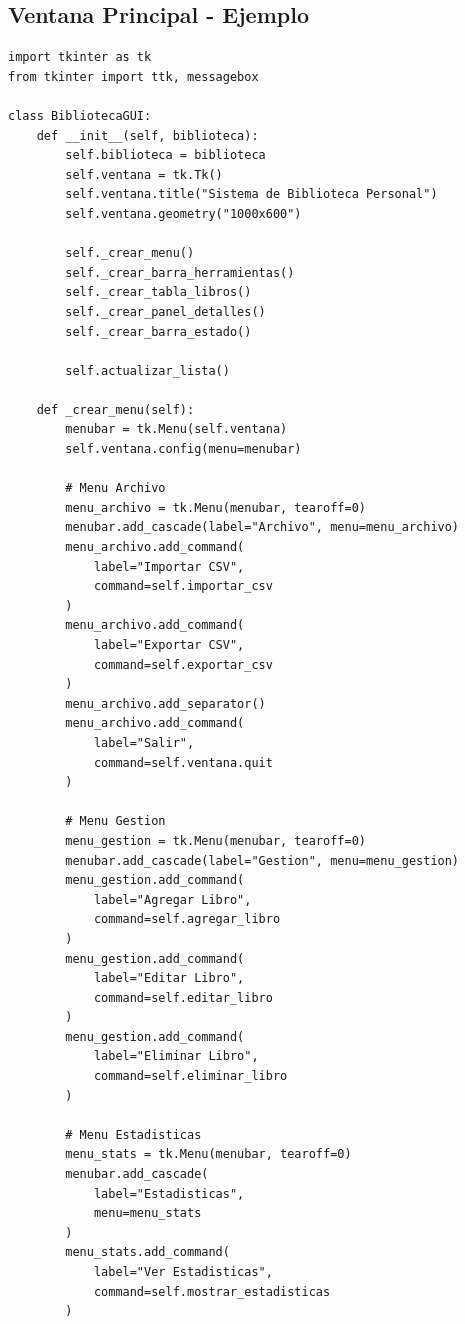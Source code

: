 \documentclass[12pt,a4paper]{article}
\begin{document}
\subsection{Ventana Principal - Ejemplo}

\begin{lstlisting}[caption=Estructura básica de la interfaz]
import tkinter as tk
from tkinter import ttk, messagebox

class BibliotecaGUI:
    def __init__(self, biblioteca):
        self.biblioteca = biblioteca
        self.ventana = tk.Tk()
        self.ventana.title("Sistema de Biblioteca Personal")
        self.ventana.geometry("1000x600")
        
        self._crear_menu()
        self._crear_barra_herramientas()
        self._crear_tabla_libros()
        self._crear_panel_detalles()
        self._crear_barra_estado()
        
        self.actualizar_lista()
    
    def _crear_menu(self):
        menubar = tk.Menu(self.ventana)
        self.ventana.config(menu=menubar)
        
        # Menu Archivo
        menu_archivo = tk.Menu(menubar, tearoff=0)
        menubar.add_cascade(label="Archivo", menu=menu_archivo)
        menu_archivo.add_command(
            label="Importar CSV", 
            command=self.importar_csv
        )
        menu_archivo.add_command(
            label="Exportar CSV", 
            command=self.exportar_csv
        )
        menu_archivo.add_separator()
        menu_archivo.add_command(
            label="Salir", 
            command=self.ventana.quit
        )
        
        # Menu Gestion
        menu_gestion = tk.Menu(menubar, tearoff=0)
        menubar.add_cascade(label="Gestion", menu=menu_gestion)
        menu_gestion.add_command(
            label="Agregar Libro", 
            command=self.agregar_libro
        )
        menu_gestion.add_command(
            label="Editar Libro", 
            command=self.editar_libro
        )
        menu_gestion.add_command(
            label="Eliminar Libro", 
            command=self.eliminar_libro
        )
        
        # Menu Estadisticas
        menu_stats = tk.Menu(menubar, tearoff=0)
        menubar.add_cascade(
            label="Estadisticas", 
            menu=menu_stats
        )
        menu_stats.add_command(
            label="Ver Estadisticas", 
            command=self.mostrar_estadisticas
        )
    

\end{lstlisting}
\end{document}

